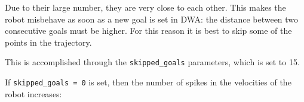 \documentclass[11pt,a4paper]{article}
\begin{document}
Due to their large number, they are very close to each other. This makes the robot misbehave as soon as
a new goal is set in DWA: the distance between two consecutive goals must be higher.
For this reason it is best to skip some of the points in the trajectory.

This is accomplished through the \texttt{skipped\_goals} parameters, which is set to 15.\\

\newpage

If \texttt{skipped\_goals = 0} is set, then the number of spikes in the velocities of the robot increases:
\begin{figure}[H]
    \centering
    \quad
\end{figure}
\end{document}
